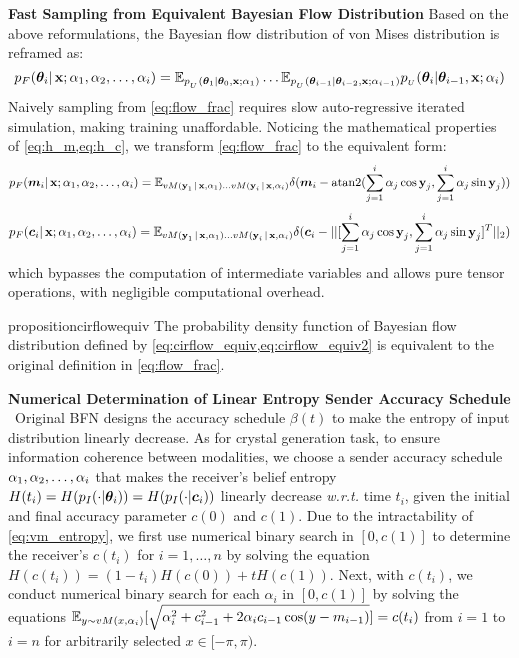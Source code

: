 \textbf{Fast Sampling from Equivalent Bayesian Flow Distribution} Based on the above reformulations, the Bayesian flow distribution of von Mises distribution is reframed as: 
\begin{equation}\label{eq:flow_frac}
p_F(\bm{\theta}_i|\operatorname{\mathbf{x}};\alpha_1,\alpha_2,\dots,\alpha_i)=\mathbb{E}_{p_{_U}(\boldsymbol{\theta}_{1} \mid \boldsymbol{\theta}_{0}, \operatorname{\mathbf{x}} ; \alpha_{1})}\dots\mathbb{E}_{p_{_U}(\boldsymbol{\theta}_{i-1} \mid \boldsymbol{\theta}_{i-2}, \operatorname{\mathbf{x}}; \alpha_{i-1})} p_{_U}(\boldsymbol{\theta}_{i} | \boldsymbol{\theta}_{i-1},\operatorname{\mathbf{x}};\alpha_{i} )
\end{equation}
Naively sampling from \cref{eq:flow_frac} requires slow auto-regressive iterated simulation, making training unaffordable. Noticing the mathematical properties of \cref{eq:h_m,eq:h_c}, we  transform \cref{eq:flow_frac} to the equivalent form:
\begin{equation}\label{eq:cirflow_equiv}
p_F(\boldsymbol{m}_i|\operatorname{\mathbf{x}};\alpha_1,\alpha_2,\dots,\alpha_i)=\mathbb{E}_{vM(\operatorname{\mathbf{y}}_1|\operatorname{\mathbf{x}},\alpha_1)\dots vM(\operatorname{\mathbf{y}}_i|\operatorname{\mathbf{x}},\alpha_i)} \delta(\boldsymbol{m}_i-\text{atan2}(\sum_{j=1}^i \alpha_j \cos \operatorname{\mathbf{y}}_j,\sum_{j=1}^i \alpha_j \sin \operatorname{\mathbf{y}}_j))
\end{equation}
\begin{equation}\label{eq:cirflow_equiv2}
p_F(\boldsymbol{c}_i|\operatorname{\mathbf{x}};\alpha_1,\alpha_2,\dots,\alpha_i)=\mathbb{E}_{vM(\operatorname{\mathbf{y}}_1|\operatorname{\mathbf{x}},\alpha_1)\dots vM(\operatorname{\mathbf{y}}_i|\operatorname{\mathbf{x}},\alpha_i)}  \delta(\boldsymbol{c}_i-||[\sum_{j=1}^i \alpha_j \cos \operatorname{\mathbf{y}}_j,\sum_{j=1}^i \alpha_j \sin \operatorname{\mathbf{y}}_j]^T||_2)
\end{equation}
which bypasses the computation of intermediate variables and allows pure tensor operations, with negligible computational overhead.
\begin{restatable}{proposition}{cirflowequiv}
The probability density function of Bayesian flow distribution defined by \cref{eq:cirflow_equiv,eq:cirflow_equiv2} is equivalent to the original definition in \cref{eq:flow_frac}. 
\end{restatable}
\textbf{Numerical Determination of Linear Entropy Sender Accuracy Schedule} ~Original BFN designs the accuracy schedule $\beta(t)$ to make the entropy of input distribution linearly decrease. As for crystal generation task, to ensure information coherence between modalities, we choose a sender accuracy schedule $\alpha_1,\alpha_2,\dots,\alpha_i$ that makes the receiver's belief entropy $H(t_i)=H(p_I(\cdot|{\bm{\theta}}_i))=H(p_I(\cdot|{\bm{c}}_i))$ linearly decrease \emph{w.r.t.} time $t_i$, given the initial and final accuracy parameter $c(0)$ and $c(1)$. Due to the intractability of \cref{eq:vm_entropy}, we first use numerical binary search in $[0,c(1)]$ to determine the receiver's $c(t_i)$ for $i=1,\dots, n$ by solving the equation $H(c(t_i))=(1-t_i)H(c(0))+tH(c(1))$. Next, with $c(t_i)$, we conduct numerical binary search for each $\alpha_i$ in $[0,c(1)]$ by solving the equations $\mathbb{E}_{y\sim vM(x,\alpha_i)}[\sqrt{\alpha_i^2+c_{i-1}^2+2\alpha_i c_{i-1}\cos(y-m_{i-1})}]=c(t_i)$ from $i=1$ to $i=n$ for arbitrarily selected $x\in[-\pi,\pi)$.

